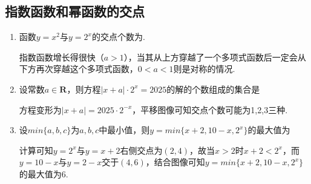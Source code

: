     \subsection*{指数函数和幂函数的交点}
    \begin{enumerate}
        \item 函数$y = x^2$与$y = 2^x$的交点个数为. 
        \begin{jieda}
            指数函数增长得很快（$a > 1$），当其从上方穿越了一个多项式函数后一定会从下方再次穿越这个多项式函数，$0 < a < 1$则是对称的情况.
        \end{jieda}
        \item 设常数$a \in \mathbf{R}$，则方程$|x+a| \cdot 2^x = 2025$的解的个数组成的集合是
        \begin{jieda}
            方程变形为$|x+a| = 2025 \cdot 2^{-x}$，平移图像可知交点个数可能为1,2,3三种.
        \end{jieda}
        \item 设$min\{a, b, c\}$为$a, b, c$中最小值，则$y = min\{x+2, 10-x, 2^x\}$的最大值为
        \begin{jieda}
            计算可知$y = 2^x$与$y = x+2$右侧交点为$(2, 4)$，故当$x > 2$时$x+2 < 2^x$，而$y = 10-x$与$y = 2-x$交于$(4, 6)$，结合图像可知$y = min\{x+2, 10-x, 2^x\}$的最大值为6.
        \end{jieda}
    \end{enumerate}
